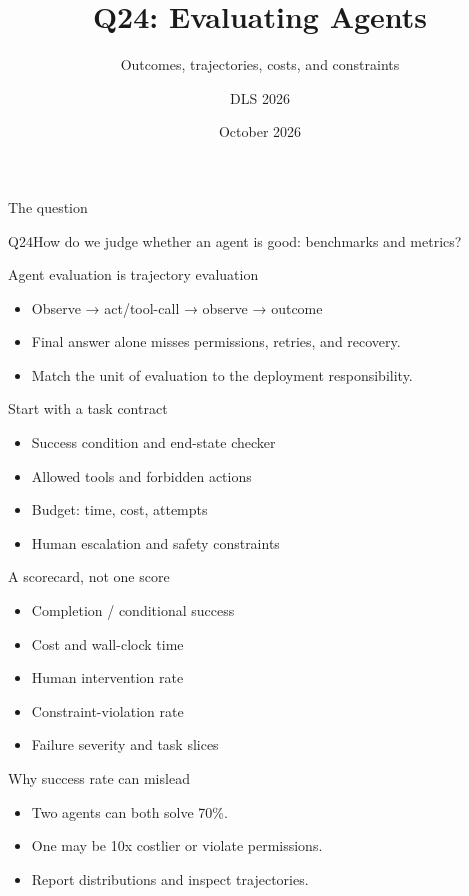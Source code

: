 \documentclass[aspectratio=169,10pt]{beamer}\usetheme{metropolis}\title{Q24: Evaluating Agents}\subtitle{Outcomes, trajectories, costs, and constraints}\author{DLS 2026}\date{October 2026}
\begin{document}
\maketitle
\begin{frame}{The question}\begin{block}{Q24}How do we judge whether an agent is good: benchmarks and metrics?\end{block}\end{frame}
\begin{frame}{Agent evaluation is trajectory evaluation}\begin{itemize}\item Observe → act/tool-call → observe → outcome\item Final answer alone misses permissions, retries, and recovery.\item Match the unit of evaluation to the deployment responsibility.\end{itemize}\end{frame}
\begin{frame}{Start with a task contract}\begin{itemize}\item Success condition and end-state checker\item Allowed tools and forbidden actions\item Budget: time, cost, attempts\item Human escalation and safety constraints\end{itemize}\end{frame}
\begin{frame}{A scorecard, not one score}\begin{itemize}\item Completion / conditional success\item Cost and wall-clock time\item Human intervention rate\item Constraint-violation rate\item Failure severity and task slices\end{itemize}\end{frame}
\begin{frame}{Why success rate can mislead}\begin{itemize}\item Two agents can both solve 70\%.\item One may be 10x costlier or violate permissions.\item Report distributions and inspect trajectories.\end{itemize}\end{frame}
\end{document}
